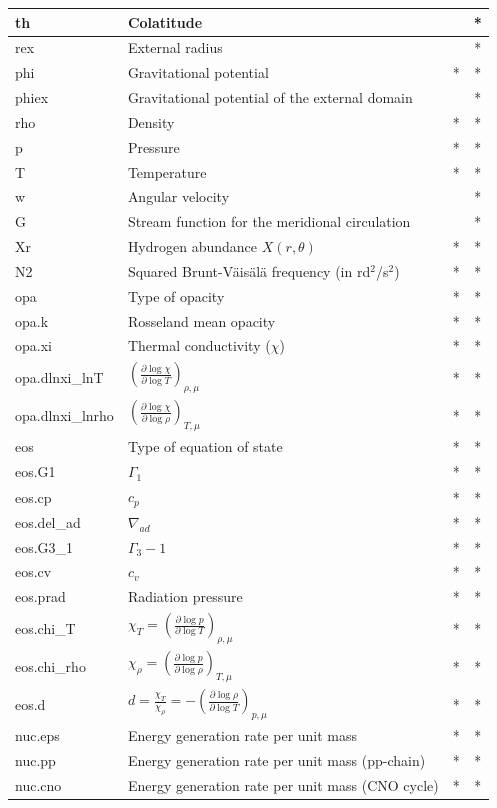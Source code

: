 \begin{longtable}{|l|p{8cm}|c|c|}
\hline
th&Colatitude&&*\\
\hline
rex&External radius&&*\\
\hline
phi&Gravitational potential&*&*\\
\hline
phiex&Gravitational potential of the external domain&&*\\
\hline
rho&Density&*&*\\
\hline
p&Pressure&*&*\\
\hline
T&Temperature&*&*\\
\hline
w&Angular velocity&&*\\
\hline
G&Stream function for the meridional circulation&&*\\
\hline
Xr&Hydrogen abundance $X(r,\theta)$&*&*\\
\hline
N2&Squared Brunt-V\"ais\"al\"a frequency (in rd$^2$/s$^2$)&*&*\\
\hline
opa&Type of opacity&*&*\\
\hline
opa.k&Rosseland mean opacity&*&*\\
\hline
opa.xi&Thermal conductivity ($\chi$)&*&*\\
\hline
opa.dlnxi\_lnT&$\left(\frac{\partial\log\chi}{\partial\log T}\right)_{\rho,\mu}$&*&*\\
\hline
opa.dlnxi\_lnrho&$\left(\frac{\partial\log\chi}{\partial\log\rho}\right)_{T,\mu}$&*&*\\
\hline
eos&Type of equation of state&*&*\\
\hline
eos.G1&$\Gamma_1$&*&*\\
\hline
eos.cp&$c_p$&*&*\\
\hline
eos.del\_ad&$\nabla_{ad}$&*&*\\
\hline
eos.G3\_1&$\Gamma_3-1$&*&*\\
\hline
eos.cv&$c_v$&*&*\\
\hline
eos.prad&Radiation pressure&*&*\\
\hline
eos.chi\_T&$\chi_T=\left(\frac{\partial\log p}{\partial\log T}\right)_{\rho,\mu}$&*&*\\
\hline
eos.chi\_rho&$\chi_\rho=\left(\frac{\partial\log p}{\partial\log\rho}\right)_{T,\mu}$&*&*\\
\hline
eos.d&$d=\frac{\chi_T}{\chi_\rho}=-\left(\frac{\partial\log\rho}{\partial\log T}\right)_{p,\mu}$&*&*\\
\hline
nuc.eps&Energy generation rate per unit mass&*&*\\
\hline
nuc.pp&Energy generation rate per unit mass (pp-chain)&*&*\\
\hline
nuc.cno&Energy generation rate per unit mass (CNO cycle)&*&*\\

\end{longtable}
